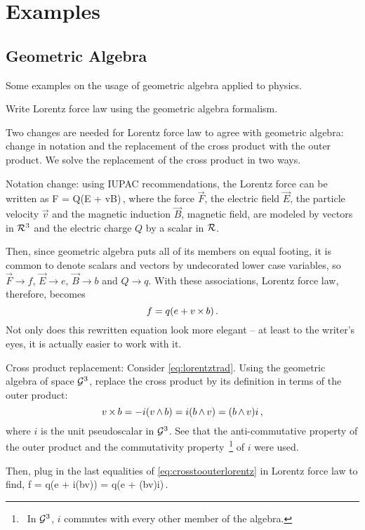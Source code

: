 \section{Examples}

\subsection{Geometric Algebra}
Some examples on the usage of geometric algebra applied to physics.

\begin{example}
Write Lorentz force law using the geometric algebra formalism.
\end{example}

Two changes are needed for Lorentz force law to agree with geometric algebra: change in notation and the replacement of the cross product with the outer product. We solve the replacement of the cross product in two ways.

\begin{solution}
Notation change: using IUPAC recommendations, the Lorentz force can be written as
\beq
\vec F = Q(\vec E + \vec v\cprod \vec B)\,,
\eeq
where the force $\vec F$, the electric field $\vec E$, the particle velocity $\vec v$ and the magnetic induction $\vec B$, \aka magnetic field, are modeled by vectors in $\mathcal{R}^{3}$ and the electric charge $Q$ by a scalar in $\mathcal{R}$. 

Then, since geometric algebra puts all of its members on equal footing, it is common to denote scalars and vectors by undecorated lower case variables, so $\vec F\to f$, $\vec E\to e$, $\vec B\to b$ and $Q\to q$. With these associations, Lorentz force law, therefore, becomes
\begin{equation}\label{eq:lorentztrad}
f = q(e + v\operatorname{\times} b)\,.
\end{equation}
Not only does this rewritten equation look more elegant -- at least to the writer's eyes, it is actually easier to work with it.
\end{solution}

\begin{solution}
Cross product replacement: Consider \cref{eq:lorentztrad}. Using the geometric algebra of space $\mathcal{G}^{3}$, replace the cross product by its definition in terms of the outer product:
\begin{equation}\label{eq:crosstoouterlorentz}
v\operatorname{\times} b = -i(v\operatorname{\wedge} b) = i(b\operatorname{\wedge} v) = (b\operatorname{\wedge} v)i\,,
\end{equation}
where $i$ is the unit pseudoscalar in $\mathcal{G}^{3}$. See that the anti-commutative property of the outer product and the commutativity property~\footnote{~In $\mathcal{G}^{3}$, $i$ commutes with every other member of the algebra.} of $i$ were used.

Then, plug in the last equalities of \cref{eq:crosstoouterlorentz} in Lorentz force law to find,
\beq
f = q(e + i(b\oprod v)) = q(e + (b\oprod v)i)\,.\mqed
\eeq
\end{solution}

